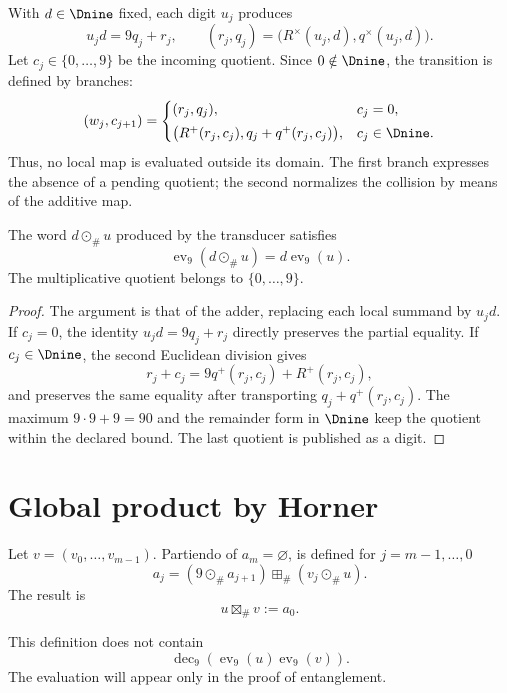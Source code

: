 \begin{algorithm}
With $d\in\Dnine$ fixed, each digit $u_j$ produces
\[
 u_jd=9q_j+r_j,
 \qquad
 (r_j,q_j)=\bigl(R^\times(u_j,d),q^\times(u_j,d)\bigr).
\]
Let $c_j\in\{0,\ldots,9\}$ be the incoming quotient. Since $0\notin\Dnine$,
the transition is defined by branches:
\[
 (w_j,c_{j+1})=
 \begin{cases}
 (r_j,q_j),&c_j=0,\\[1mm]
 \bigl(R^+(r_j,c_j),q_j+q^+(r_j,c_j)\bigr),&c_j\in\Dnine.
 \end{cases}
\]
Thus, no local map is evaluated outside its domain. The first
branch expresses the absence of a pending quotient; the second normalizes the
collision by means of the additive map.
\end{algorithm}

\begin{lemma}
The word $d\odot_\#u$ produced by the transducer satisfies
\[
 \operatorname{ev}_9(d\odot_\#u)
 =d\operatorname{ev}_9(u).
\]
The multiplicative quotient belongs to $\{0,\ldots,9\}$.
\end{lemma}

\begin{proof}
The argument is that of the adder, replacing each local summand by
$u_jd$. If $c_j=0$, the identity
$u_jd=9q_j+r_j$ directly preserves the partial equality. If
$c_j\in\Dnine$, the second Euclidean division gives
\[
 r_j+c_j=9q^+(r_j,c_j)+R^+(r_j,c_j),
\]
and preserves the same equality after transporting
$q_j+q^+(r_j,c_j)$. The maximum $9\cdot9+9=90$ and the remainder form in
$\Dnine$ keep the quotient within the declared bound. The last quotient is
published as a digit.
\end{proof}

\section{Global product by Horner}

\begin{definition}
Let $v=(v_0,\ldots,v_{m-1})$. Partiendo of $a_m=\varnothing$, is defined for
$j=m-1,\ldots,0$
\[
 a_j=(9\odot_\#a_{j+1})\boxplus_\#(v_j\odot_\#u).
\]
The result is
\[
 u\boxtimes_\#v:=a_0.
\]
\end{definition}

This definition does not contain
\[
 \operatorname{dec}_9(\operatorname{ev}_9(u)\operatorname{ev}_9(v)).
\]
The evaluation will appear only in the proof of entanglement.


